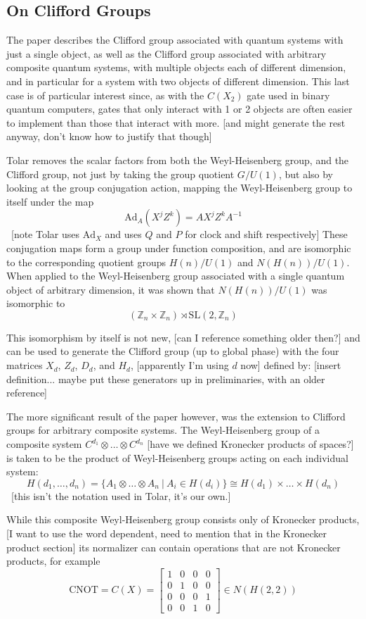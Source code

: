 \subsection{On Clifford Groups}
The paper \cite{tolar-clifford} describes the Clifford group associated with quantum systems with just a single object, as well as the Clifford group associated with arbitrary composite quantum systems, with multiple objects each of different dimension, and in particular for a system with two objects of different dimension. This last case is of particular interest since, as with the $C(X_2)$ gate used in binary quantum computers, gates that only interact with 1 or 2 objects are often easier to implement than those that interact with more. [and might generate the rest anyway, don't know how to justify that though]

Tolar removes the scalar factors from both the Weyl-Heisenberg group, and the Clifford group, not just by taking the group quotient $G/U(1)$, but also by looking at the group conjugation action, mapping the Weyl-Heisenberg group to itself under the map
\[\text{Ad}_A(X^jZ^k) = AX^jZ^kA^{-1}\]
\ [note Tolar uses $\text{Ad}_X$ and uses $Q$ and $P$ for clock and shift respectively] These conjugation maps form a group under function composition, and are isomorphic to the corresponding quotient groups $H(n)/U(1)$ and $N(H(n))/U(1)$. When applied to the Weyl-Heisenberg group associated with a single quantum object of arbitrary dimension, it was shown that $N(H(n))/U(1)$ was isomorphic to
\[(\mathbb{Z}_n\times\mathbb{Z}_n)\rtimes\text{SL}(2,\mathbb{Z}_n)\]

This isomorphism by itself is not new, [can I reference something older then?] and can be used to generate the Clifford group (up to global phase) with the four matrices $X_d$, $Z_d$, $D_d$, and $H_d$, [apparently I'm using $d$ now] defined by:
[insert definition... maybe put these generators up in preliminaries, with an older reference]

The more significant result of the paper however, was the extension to Clifford groups for arbitrary composite systems. The Weyl-Heisenberg group of a composite system $C^{d_1}\otimes \dots \otimes C^{d_n}$ [have we defined Kronecker products of spaces?] is taken to be the product of Weyl-Heisenberg groups acting on each individual system:
\[H(d_1, \dots, d_n) = \{A_1 \otimes \dots \otimes A_n\ |\ A_i \in H(d_i)\} \cong H(d_1) \times \dots \times H(d_n)\]
\ [this isn't the notation used in Tolar, it's our own.]

While this composite Weyl-Heisenberg group consists only of Kronecker products, [I want to use the word dependent, need to mention that in the Kronecker product section] its normalizer can contain operations that are not Kronecker products, for example
\[\text{CNOT} = C(X) = \left[\begin{matrix}
	1 & 0 & 0 & 0 \\
	0 & 1 & 0 & 0 \\
	0 & 0 & 0 & 1 \\
	0 & 0 & 1 & 0
\end{matrix}\right] \in N(H(2, 2))\]

